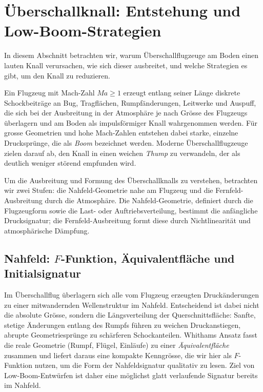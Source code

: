 \section{Überschallknall: Entstehung und Low-Boom-Stra\-te\-gien
\label{schall:section:boom}}

In diesem Abschnitt betrachten wir, warum Überschallflugzeuge am Boden
einen lauten Knall verursachen, wie sich dieser ausbreitet, und welche
Strategien es gibt, um den Knall zu reduzieren.

Ein Flugzeug mit Mach-Zahl $\textit{Ma}\ge1$ erzeugt entlang seiner Länge diskrete
Schockbeiträge an Bug, Tragflächen, Rumpfänderungen, Leitwerke und Auspuff,
die sich bei der Ausbreitung in der Atmosphäre je nach Grösse des Flugzeugs
überlagern und am Boden als impulsförmiger Knall wahrgenommen werden.
Für grosse Geometrien und hohe Mach-Zahlen entstehen dabei
starke, einzelne Drucksprünge, die als \emph{Boom} bezeichnet werden.
%
Moderne Überschallflugzeuge zielen darauf ab, den Knall in einen
weichen \emph{Thump} zu verwandeln, der als deutlich weniger störend
%
empfunden wird.

Um die Ausbreitung und Formung des Überschallknalls zu verstehen, betrachten wir
zwei Stufen: die Nahfeld-Geometrie nahe am Flugzeug und die Fernfeld-Ausbreitung
durch die Atmosphäre.
Die Nahfeld-Geometrie, definiert durch die Flugzeugform sowie die  Last- oder
Auftriebsverteilung, bestimmt die anfängliche Drucksignatur;
die Fernfeld-Ausbreitung formt diese durch Nichtlinearität und atmosphärische Dämpfung.

\subsection{Nahfeld: $F$-Funktion, Äquivalentfläche und Initialsignatur}
Im Überschallflug überlagern sich alle vom Flugzeug erzeugten
Druckänderungen zu einer mitwandernden Wellenstruktur im Nahfeld.
Entscheidend ist dabei nicht die absolute Grösse, sondern die
Längsverteilung der Querschnittsfläche:
Sanfte, stetige Änderungen entlang des Rumpfs führen zu weichen
Druckanstiegen, abrupte Geometriesprünge zu schärferen Schockanteilen.
Whithams Ansatz fasst die reale Geometrie (Rumpf, Flügel, Einläufe) zu
einer \emph{Äquivalentfläche} zusammen und liefert daraus eine kompakte
%
Kenngrösse, die wir hier als \(F\)-Funktion nutzen, um
die Form der Nahfeldsignatur qualitativ zu lesen.
Ziel von Low-Boom-Entwürfen ist daher eine möglichst glatt
verlaufende Signatur bereits im Nahfeld.

